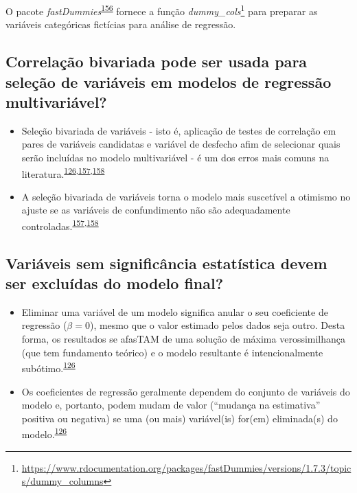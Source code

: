 \documentclass[
  a4paper,
]{book}
\renewcommand{\href}[2]{#2\footnote{\url{#1}}}
\newenvironment{infobox}[1]
  {
  \begin{itemize}
  \renewcommand{\labelitemi}{
    \raisebox{-.7\height}[0pt][0pt]{
      {\setkeys{Gin}{width=3em,keepaspectratio}
        \texttt{[image: \#1]}}
    }
  }
  \setlength{\fboxsep}{1em}
  \begin{blackbox}
  \item
  }
  {
  \end{blackbox}
  \end{itemize}
  }
\begin{document}
\begin{infobox}{images/Rlogo}
O pacote \emph{fastDummies}\textsuperscript{\protect\hyperlink{ref-fastDummies}{156}} fornece a função \href{https://www.rdocumentation.org/packages/fastDummies/versions/1.7.3/topics/dummy_columns}{\emph{dummy\_cols}} para preparar as variáveis categóricas fictícias para análise de regressão.

\end{infobox}

\hypertarget{correlauxe7uxe3o-bivariada-pode-ser-usada-para-seleuxe7uxe3o-de-variuxe1veis-em-modelos-de-regressuxe3o-multivariuxe1vel}{%
\subsection{Correlação bivariada pode ser usada para seleção de variáveis em modelos de regressão multivariável?}\label{correlauxe7uxe3o-bivariada-pode-ser-usada-para-seleuxe7uxe3o-de-variuxe1veis-em-modelos-de-regressuxe3o-multivariuxe1vel}}

\begin{itemize}
\item
  Seleção bivariada de variáveis - isto é, aplicação de testes de correlação em pares de variáveis candidatas e variável de desfecho afim de selecionar quais serão incluídas no modelo multivariável - é um dos erros mais comuns na literatura.\textsuperscript{\protect\hyperlink{ref-heinze2016}{126},\protect\hyperlink{ref-Dales1978}{157},\protect\hyperlink{ref-Sun1996}{158}}
\item
  A seleção bivariada de variáveis torna o modelo mais suscetível a otimismo no ajuste se as variáveis de confundimento não são adequadamente controladas.\textsuperscript{\protect\hyperlink{ref-Dales1978}{157},\protect\hyperlink{ref-Sun1996}{158}}
\end{itemize}

\hypertarget{variuxe1veis-sem-significuxe2ncia-estatuxedstica-devem-ser-excluuxeddas-do-modelo-final}{%
\subsection{Variáveis sem significância estatística devem ser excluídas do modelo final?}\label{variuxe1veis-sem-significuxe2ncia-estatuxedstica-devem-ser-excluuxeddas-do-modelo-final}}

\begin{itemize}
\item
  Eliminar uma variável de um modelo significa anular o seu coeficiente de regressão (\(\beta = 0\)), mesmo que o valor estimado pelos dados seja outro. Desta forma, os resultados se afasTAM de uma solução de máxima verossimilhança (que tem fundamento teórico) e o modelo resultante é intencionalmente subótimo.\textsuperscript{\protect\hyperlink{ref-heinze2016}{126}}
\item
  Os coeficientes de regressão geralmente dependem do conjunto de variáveis do modelo e, portanto, podem mudam de valor (``mudança na estimativa'' positiva ou negativa) se uma (ou mais) variável(is) for(em) eliminada(s) do modelo.\textsuperscript{\protect\hyperlink{ref-heinze2016}{126}}
\end{itemize}
\end{document}
